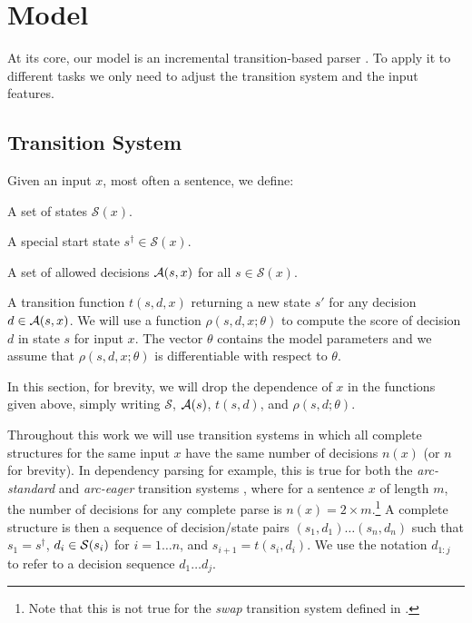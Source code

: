 \section{Model}
\label{sec:model}
\newcommand{\score}{\rho}
\newcommand{\starts}{s^{\dagger}}
\newcommand{\xt}{{; \theta}}
\newcommand{\xtt}{{\theta}}
\newcommand{\cx}{{}}

At its core, our model is an incremental transition-based parser \cite{Nivre:2006}.
To apply it to different tasks we only need to adjust
the transition system and the input features.

\subsection{Transition System}

Given an input $x$, most often a sentence, we define:
\bitem
\item A set of states $\mathcal S(x)$.
\item A special start state $\starts \in\mathcal S(x)$.
\item A set of allowed decisions ${\cal A}(s, x)$ for all $s\in\mathcal S(x)$.
\item A transition function $t(s, d, x)$ returning a new state $s'$ for
  any decision $d\in {\cal A}(s, x)$.
\eitem 
We will use a function
$\score(s, d, x; \theta)$ to compute the score of decision $d$ in state
$s$ for input $x$. The vector $\theta$ contains the model parameters and we assume
that $\score(s, d, x; \theta)$ is differentiable with respect to
$\theta$.

In this section, for brevity, we will drop the dependence of $x$
in the functions given above, simply writing $\mathcal S$, ${\cal
  A}(s)$, $t(s, d)$, and $\score(s, d; \theta)$.

Throughout this work we will use transition systems in which all
complete structures for the same input $x$ have the same number of
decisions $n(x)$ (or $n$ for brevity).  In dependency parsing for
example, this is true for both the {\em arc-standard} and {\em
  arc-eager} transition systems \cite{Nivre:2006}, where for a
sentence $x$ of length $m$, the number of decisions for any complete
parse is $n(x) = 2 \times m$.\footnote{Note that this is not true for
  the {\em swap} transition system defined in
  .}  
A complete structure is then a sequence of decision/state pairs $(s_1,
d_1) \ldots (s_n,d_n)$ such that $s_1 = \starts$, $d_i \in {\cal S}(s_i)$ for
$i = 1 \ldots n$, and $s_{i+1} = t(s_i, d_i)$.
We use the notation $d_{1:j}$ to refer to a decision
sequence $d_1 \ldots d_j$.

